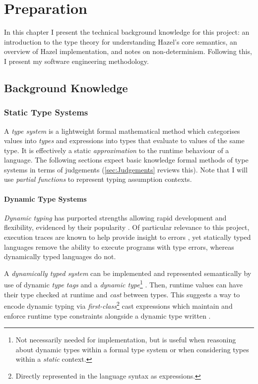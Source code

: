 \chapter{Preparation}
\label{chap:Preparation}
In this chapter I present the technical background knowledge for this project: an introduction to the type theory for understanding Hazel's core semantics, an overview of Hazel implementation, and notes on non-determinism. Following this, I present my software engineering methodology.

\section{Background Knowledge}\label{sec:BackgroundKnowledge}
\subsection{Static Type Systems}\label{sec:TypeSystems}
A \textit{type system} is a lightweight formal mathematical method which categorises values into \textit{types} and expressions into types that evaluate to values of the same type. It is effectively a static \textit{approximation} to the runtime behaviour of a language. The following sections expect basic knowledge formal methods of type systems in terms of judgements (\cref{sec:Judgements} reviews this). Note that I will use \textit{partial functions} to represent typing assumption contexts. 


\subsubsection{Dynamic Type Systems}\label{sec:DynamicTypeSystem}
\textit{Dynamic typing} has purported strengths allowing rapid development and flexibility, evidenced by their popularity \cite{DynamicLangShift, TIOBE}. Of particular relevance to this project, execution traces are known to help provide insight to errors \cite{TraceVisualisation}, yet statically typed languages remove the ability to execute programs with type errors, whereas dynamically typed languages do not.\par 

A \textit{dynamically typed system} can be implemented and represented semantically by use of dynamic \textit{type tags} and a \textit{dynamic type}\footnote{Not necessarily needed for implementation, but is useful when reasoning about dynamic types within a formal type system or when considering types within a \textit{static} context.} \cite{DynamicTyping}. Then, runtime values can have their type checked at runtime and \textit{cast} between types. This suggests a way to encode dynamic typing via \textit{first-class}\footnote{Directly represented in the language syntax as expressions.} cast expressions which maintain and enforce runtime type constraints alongside a dynamic type written \dyn.

